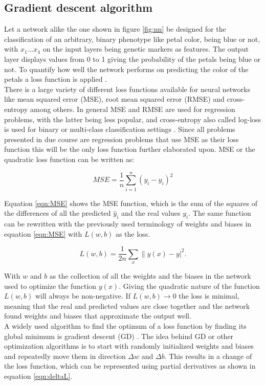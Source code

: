 \subsection{Gradient descent algorithm}

Let a network alike the one shown in figure \ref{fig:nn} be designed for the
classification of an arbitrary, binary phenotype like petal color, being blue or not, with $x_1 \dots x_4$ on the
input layers being genetic markers as features. The output layer displays values from 0 to
1 giving the probability of the petals being blue or not. To quantify how well the network
performs on predicting the color of the petals a loss
function is applied \cite{schmidhuber2015deep}. \\
There is a large variety of different loss functions available for neural networks like
mean squared error (MSE), root mean squared error (RMSE) and cross-entropy among
others. In general MSE and RMSE are used for regression problems, with the latter being
less popular, and cross-entropy also called log-loss is used for binary or multi-class
classification settings \cite{janocha2017loss}. Since all problems presented in due course
are regression problems that use MSE as their loss function this will be the only loss
function further elaborated upon. MSE or the quadratic loss function can be written as:

\begin{equation}
 MSE = \frac{1}{n} \sum_{i=1}^n (y_i - \hat{y}_i)^2
 \label{eqn:MSE}
\end{equation}

Equation \ref{eqn:MSE} shows the MSE function, which is the sum of the squares of the
differences of all the predicted $\hat{y}_i$ and the real values $y_i$. The same function
can be rewritten with the previously used terminology of weights and biases in equation
\ref{eqn:MSE} with $L(w,b)$ as the loss.

\begin{equation}
  L(w,b) = \frac{1}{2n} \sum_x \| y(x) - y|^2.
 \label{eqn:MSE2}
\end{equation}


With $w$ and $b$ as the collection of all the weights and the biases in the network used
to optimize the function $y(x)$. Giving the quadratic nature of the function $L(w,b)$ will
always be non-negative. If $L(w,b) \rightarrow 0$ the loss is minimal, meaning
that the real and predicted values are close together and the network found weights and biases that approximate the output well. \\
A widely used algorithm to find the optimum of a loss function by finding its global
minimum is gradient descent (GD) \cite{bottou1991stochastic}. The idea behind GD or other
optimization algorithms is to start with randomly initialized weights and biases and
repeatedly move them in direction $\Delta w$ and $\Delta b$. This results in a change of
the loss function, which can be represented using partial derivatives as shown in equation
\ref{eqn:deltaL}.

